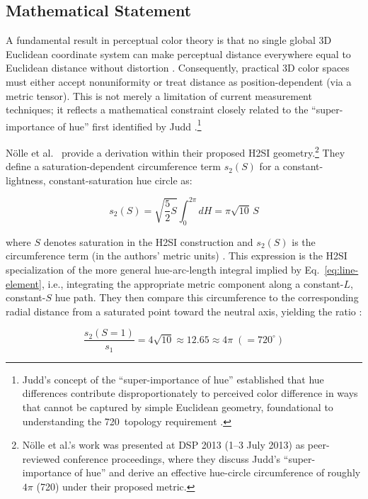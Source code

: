 \subsection{Mathematical Statement}

A fundamental result in perceptual color theory is that no single global 3D Euclidean coordinate system can make perceptual distance everywhere equal to Euclidean distance without distortion \citep[p.~2]{nolle2013h2si_ms}. Consequently, practical 3D color spaces must either accept nonuniformity or treat distance as position-dependent (via a metric tensor). This is not merely a limitation of current measurement techniques; it reflects a mathematical constraint closely related to the ``super-importance of hue'' first identified by Judd \citep[p.~11]{judd1940}.\footnote{Judd's concept of the ``super-importance of hue'' established that hue differences contribute disproportionately to perceived color difference in ways that cannot be captured by simple Euclidean geometry, foundational to understanding the 720\textdegree~topology requirement \citep{nolle2012}.}

Nölle et al.\ \citeyearpar{nolle2012} provide a derivation within their proposed H2SI geometry.\footnote{Nölle et al.'s work was presented at DSP 2013 (1--3 July 2013) as peer-reviewed conference proceedings, where they discuss Judd's ``super-importance of hue'' and derive an effective hue-circle circumference of roughly $4\pi$ (720\textdegree) under their proposed metric.} They define a saturation-dependent circumference term $s_2(S)$ for a constant-lightness, constant-saturation hue circle as:

\begin{equation}
    s_2(S) = \sqrt{\frac{5}{2}S}\int_{0}^{2\pi} dH = \pi\sqrt{10}\,S
    \label{eq:hue-circumference}
\end{equation}

\noindent where $S$ denotes saturation in the H2SI construction and $s_2(S)$ is the circumference term (in the authors' metric units) \citep[p.~9, Eq.~(3.10)]{nolle2013h2si_ms}. This expression is the H2SI specialization of the more general hue-arc-length integral implied by Eq.~\ref{eq:line-element}, i.e., integrating the appropriate metric component along a constant-$L$, constant-$S$ hue path. They then compare this circumference to the corresponding radial distance from a saturated point toward the neutral axis, yielding the ratio \citep[p.~9, Eq.~(3.11)]{nolle2013h2si_ms}:

\begin{equation}
    \frac{s_2(S=1)}{s_1} = 4\sqrt{10} \approx 12.65 \approx 4\pi\; (=720^\circ)
    \label{eq:720-result}
\end{equation}

